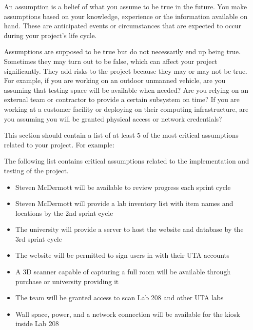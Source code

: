An assumption is a belief of what you assume to be true in the future. You make assumptions based on your knowledge, experience or the information available on hand. These are anticipated events or circumstances that are expected to occur during your project's life cycle.

Assumptions are supposed to be true but do not necessarily end up being true. Sometimes they may turn out to be false, which can affect your project significantly. They add risks to the project because they may or may not be true. For example, if you are working on an outdoor unmanned vehicle, are you assuming that testing space will be available when needed? Are you relying on an external team or contractor to provide a certain subsystem on time? If you are working at a customer facility or deploying on their computing infrastructure, are you assuming you will be granted physical access or network credentials?

This section should contain a list of at least 5 of the most critical assumptions related to your project. For example:

The following list contains critical assumptions related to the implementation and testing of the project.

\begin{itemize}
    \item Steven McDermott will be available to review progress each sprint cycle
    \item Steven McDermott will provide a lab inventory list with item names and locations by the 2nd sprint cycle
    \item The university will provide a server to host the website and database by the 3rd sprint cycle
    \item The website will be permitted to sign users in with their UTA accounts
    \item A 3D scanner capable of capturing a full room will be available through purchase or university providing it
    \item The team will be granted access to scan Lab 208 and other UTA labs
    \item Wall space, power, and a network connection will be available for the kiosk inside Lab 208
\end{itemize}
